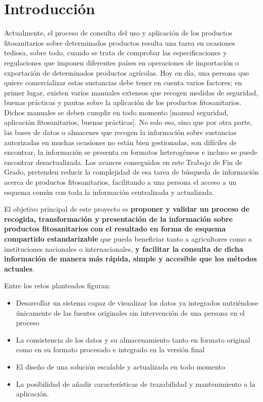\chapter{Introducción}
Actualmente, el proceso de consulta del uso y aplicación de los productos fitosanitarios sobre determinados productos resulta una tarea en ocasiones tediosa, sobre todo, cuando se trata de comprobar las especificaciones y regulaciones que imponen diferentes países en operaciones de importación o exportación de determinados productos agrícolas. Hoy en día, una persona que quiere comercializar estas sustancias debe tener en cuenta varios factores; en primer lugar, existen varios manuales extensos que recogen medidas de seguridad, buenas prácticas y pautas sobre la aplicación de los productos fitosanitarios. Dichos manuales se deben cumplir en todo momento [manual seguridad, aplicación fitosanitarios, buenas prácticas]. No solo eso, sino que por otra parte, las bases de datos o almacenes que recogen la información sobre sustancias autorizadas en muchas ocasiones no están bien gestionadas, son difíciles de encontrar, la información se presenta en formatos heterogéneos e incluso se puede encontrar desactualizada. Los avances conseguidos en este Trabajo de Fin de Grado, pretenden reducir la complejidad de esa tarea de búsqueda de información acerca de productos fitosanitarios, facilitando a una persona el acceso a un esquema común con toda la información centralizada y actualizada.\par

El objetivo principal de este proyecto es \textbf{proponer y validar un proceso de recogida, transformación y presentación de la información sobre productos fitosanitarios con el resultado en forma de esquema compartido estandarizable} que pueda beneficiar tanto a agricultores como a instituciones nacionales o internacionales, \textbf{y facilitar la consulta de dicha información de manera más rápida, simple y accesible que los métodos actuales}. \par
Entre los retos planteados figuran:
\begin{itemize}
\item Desarrollar un sistema capaz de visualizar los datos ya integrados nutriéndose únicamente de las fuentes originales sin intervención de una persona en el proceso
\item La consistencia de los datos y su almacenamiento tanto en formato original como en su formato procesado e integrado en la versión final
\item El diseño de una solución escalable y actualizada en todo momento
\item La posibilidad de añadir características de trazabilidad y mantenimiento a la aplicación.
\end{itemize}

